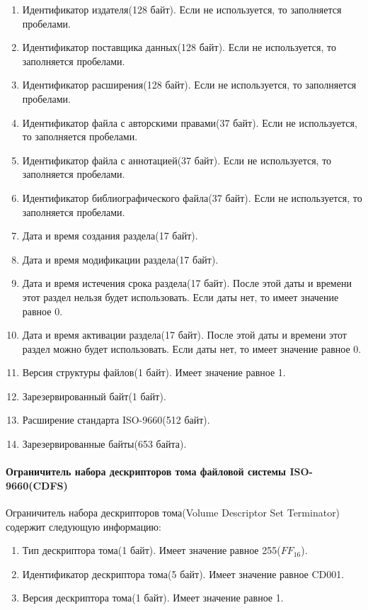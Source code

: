 \begin{enumerate}
\item Идентификатор издателя(128 байт). Если не используется, то заполняется пробелами.
\item Идентификатор поставщика данных(128 байт). Если не используется, то заполняется пробелами.
\item Идентификатор расширения(128 байт). Если не используется, то заполняется пробелами.
\item Идентификатор файла с авторскими правами(37 байт). Если не используется, то заполняется пробелами.
\item Идентификатор файла с аннотацией(37 байт). Если не используется, то заполняется пробелами.
\item Идентификатор библиографического файла(37 байт). Если не используется, то заполняется пробелами.
\item Дата и время создания раздела(17 байт).
\item Дата и время модификации раздела(17 байт).
\item Дата и время истечения срока раздела(17 байт). После этой даты и времени этот раздел нельзя будет использовать. Если даты нет, то имеет значение равное 0.
\item Дата и время активации раздела(17 байт). После этой даты и времени этот раздел можно будет использовать. Если даты нет, то имеет значение равное 0.
\item Версия структуры файлов(1 байт). Имеет значение равное 1.
\item Зарезервированный байт(1 байт).
\item Расширение стандарта ISO-9660(512 байт).
\item Зарезервированные байты(653 байта).
\end{enumerate}

\paragraph{Ограничитель набора дескрипторов тома файловой системы ISO-9660(CDFS)}

Ограничитель набора дескрипторов тома(Volume Descriptor Set Terminator) содержит следующую информацию:

\begin{enumerate}
\item Тип дескриптора тома(1 байт). Имеет значение равное 255($FF_{16}$).
\item Идентификатор дескриптора тома(5 байт). Имеет значение равное \textquotedbl CD001\textquotedbl.
\item Версия дескриптора тома(1 байт). Имеет значение равное 1.
\end{enumerate}

